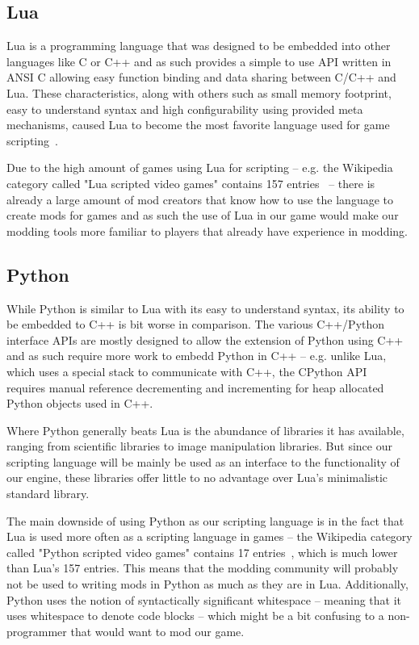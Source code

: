 \subsection{Lua}

Lua is a programming language that was designed to be embedded into other languages like C or C++ and as such
provides a simple to use API written in ANSI C allowing easy function
binding and data sharing between C/C++ and Lua. These characteristics, along with others such as small memory
footprint, easy to understand syntax and
high configurability using provided meta mechanisms, caused Lua to become the most favorite language used for game 
scripting~\cite{EngineSurvey}.

Due to the high amount of games using Lua for scripting -- e.g. the Wikipedia category called "Lua scripted video games" contains
157 entries~\cite{LuaScriptedVGs} -- there is already a large amount of mod creators that know how to use the language to
create mods for games and as such the use of Lua in our game would make our modding tools more familiar to players that already have
experience in modding.

\subsection{Python}

While Python is similar to Lua with its easy to understand syntax, its ability to be embedded to C++ is bit worse in comparison.
The various C++/Python interface APIs are mostly designed to allow the extension of Python using C++ and as such require more
work to embedd Python in C++ -- e.g. unlike Lua, which uses a special stack to communicate with C++, the CPython API~\cite{CPython}
requires manual reference decrementing and incrementing for heap allocated Python objects used in C++.

Where Python generally beats Lua is the abundance of libraries it has available, ranging from scientific libraries to image manipulation
libraries. But since our scripting language will be mainly be used as an interface to the functionality of our engine, these libraries
offer little to no advantage over Lua's minimalistic standard library.

The main downside of using Python as our scripting language is in the fact that Lua is used more often as a scripting language in games
-- the Wikipedia category called "Python scripted video games" contains 17 entries~\cite{PythonScriptedVGs}, which is much lower
than Lua's 157 entries. This means that the modding community will probably not be used to writing mods in Python as much as they are
in Lua. Additionally, Python uses the notion of syntactically significant whitespace -- meaning that it uses whitespace to denote
code blocks -- which might be a bit confusing to a non-programmer that would want to mod our game.

